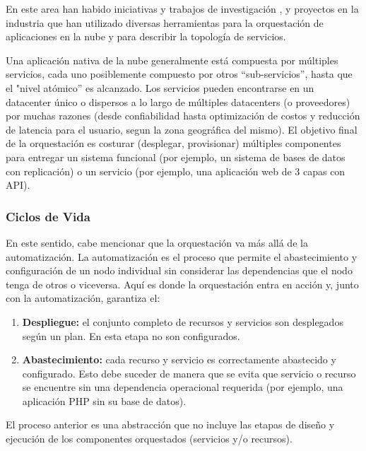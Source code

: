         En este area han habido iniciativas y trabajos de investigación \cite{Antonescu2012-ml,Juve2011-ob,Liu2011-vw,Binz2012-ru}, y proyectos en la industria \cite{Ibm2016-xb,Ibm2013-az} que han utilizado diversas herramientas para la orquestación de aplicaciones en la nube y para describir la topología de servicios.
        
        Una aplicación nativa de la nube generalmente está compuesta por múltiples servicios, cada uno posiblemente compuesto por otros “sub-servicios”, hasta que el "nivel atómico” es alcanzado. Los servicios pueden encontrarse en un datacenter único o dispersos a lo largo de múltiples datacenters (o proveedores) por muchas razones (desde confiabilidad hasta optimización de costos y reducción de latencia para el usuario, segun la zona geográfica del mismo). El objetivo final de la orquestación es costurar (desplegar, provisionar) múltiples componentes para entregar un sistema funcional (por ejemplo, un sistema de bases de datos con replicación) o un servicio (por ejemplo, una aplicación web de 3 capas con API).
	    
	    \subsubsection{Ciclos de Vida}
        En este sentido, cabe mencionar que la orquestación va más allá de la automatización. La automatización es el proceso que permite el abastecimiento y configuración de un nodo individual sin considerar las dependencias que el nodo tenga de otros o viceversa. Aquí es donde la orquestación entra en acción y, junto con la automatización, garantiza el:
        
        \begin{enumerate}
            \item \textbf{Despliegue: }el conjunto completo de recursos y servicios son desplegados según un plan. En esta etapa no son configurados.
            
            \item \textbf{Abastecimiento:} cada recurso y servicio es correctamente abastecido y configurado. Esto debe suceder de manera que se evita que servicio o recurso se encuentre sin una dependencia operacional requerida (por ejemplo, una aplicación PHP sin su base de datos).
        \end{enumerate}

	    El proceso anterior es una abstracción que no incluye las etapas de diseño y ejecución de los componentes orquestados (servicios y/o recursos).
        
